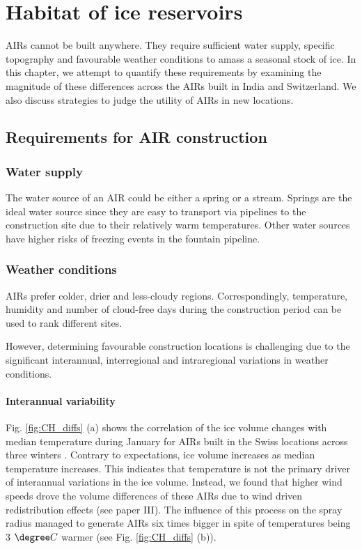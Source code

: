 \chapter{Habitat of ice reservoirs}

AIRs cannot be built anywhere. They require sufficient water supply, specific topography and favourable weather
conditions to amass a seasonal stock of ice. In this chapter, we attempt to quantify these requirements by
examining the magnitude of these differences across the AIRs built in India and Switzerland. We also discuss
strategies to judge the utility of AIRs in new locations.

\section{Requirements for AIR construction}

\subsection{Water supply}

The water source of an AIR could be either a spring or a stream. Springs are the ideal water source since they
are easy to transport via pipelines to the construction site due to their relatively warm temperatures. Other
water sources have higher risks of freezing events in the fountain pipeline.

\subsection{Weather conditions}

AIRs prefer colder, drier and less-cloudy regions. Correspondingly, temperature, humidity and number of
cloud-free days during the construction period can be used to rank different sites. 

However, determining favourable construction locations is challenging due to the significant interannual,
interregional and intraregional variations in weather conditions.

\subsubsection{Interannual variability}

Fig. \ref{fig:CH_diffs} (a) shows the correlation of the ice volume changes with median temperature during
January for AIRs built in the Swiss locations across three winters . Contrary to expectations, ice volume
increases as median temperature increases. This indicates that temperature is not the primary driver of
interannual variations in the ice volume. Instead, we found that  higher wind speeds drove the volume
differences of these AIRs due to wind driven redistribution effects (see paper III). The influence of this
process on the spray radius managed to generate AIRs six times bigger in spite of temperatures being 3 $\degree
C$ warmer (see Fig. \ref{fig:CH_diffs} (b)). 

